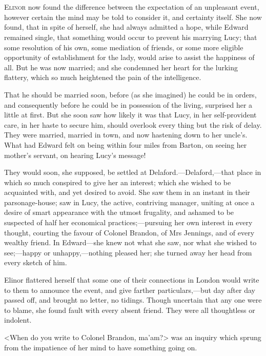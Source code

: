 \chapter[Chapter \thechapter]{}
\lettrine[lraise=0.3]{E}{linor} now found the difference between the expectation of an unpleasant event, however certain the mind may be told to consider it, and certainty itself. She now found, that in spite of herself, she had always admitted a hope, while Edward remained single, that something would occur to prevent his marrying Lucy; that some resolution of his own, some mediation of friends, or some more eligible opportunity of establishment for the lady, would arise to assist the happiness of all. But he was now married; and she condemned her heart for the lurking flattery, which so much heightened the pain of the intelligence.

That he should be married soon, before (as she imagined) he could be in orders, and consequently before he could be in possession of the living, surprised her a little at first. But she soon saw how likely it was that Lucy, in her self-provident care, in her haste to secure him, should overlook every thing but the risk of delay. They were married, married in town, and now hastening down to her uncle's. What had Edward felt on being within four miles from Barton, on seeing her mother's servant, on hearing Lucy's message!

They would soon, she supposed, be settled at Delaford.—Delaford,—that place in which so much conspired to give her an interest; which she wished to be acquainted with, and yet desired to avoid. She saw them in an instant in their parsonage-house; saw in Lucy, the active, contriving manager, uniting at once a desire of smart appearance with the utmost frugality, and ashamed to be suspected of half her economical practices;—pursuing her own interest in every thought, courting the favour of Colonel Brandon, of Mrs Jennings, and of every wealthy friend. In Edward—she knew not what she saw, nor what she wished to see;—happy or unhappy,—nothing pleased her; she turned away her head from every sketch of him.

Elinor flattered herself that some one of their connections in London would write to them to announce the event, and give farther particulars,—but day after day passed off, and brought no letter, no tidings. Though uncertain that any one were to blame, she found fault with every absent friend. They were all thoughtless or indolent.

<When do you write to Colonel Brandon, ma'am?> was an inquiry which sprung from the impatience of her mind to have something going on.

